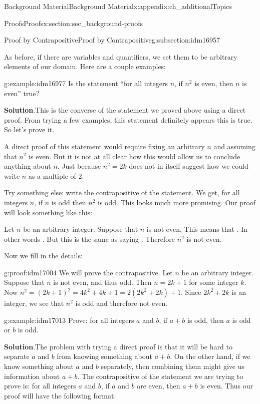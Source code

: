 \documentclass[oneside,10pt,]{book}
\numberwithin{equation}{chapter}
\begin{document}
\begin{appendixptx}{Background Material}{}{Background Material}{}{}{x:appendix:ch_additionalTopics}
\begin{sectionptx}{Proofs}{}{Proofs}{}{}{x:section:sec_background-proofs}
\begin{subsectionptx}{Proof by Contrapositive}{}{Proof by Contrapositive}{}{}{g:subsection:idm16957}
\begin{quote}
\end{quote}
As before, if there are variables and quantifiers, we set them to be arbitrary elements of our domain. Here are a couple examples:%
\begin{example}{}{g:example:idm16977}%
Is the statement ``for all integers \(n\), if \(n^2\) is even, then \(n\) is even'' true?%
\par\smallskip%
\noindent\textbf{Solution}.\hypertarget{g:solution:idm16984}{}\quad{}This is the converse of the statement we proved above using a direct proof. From trying a few examples, this statement definitely appears this is true. So let's prove it.%
\par
A direct proof of this statement would require fixing an arbitrary \(n\) and assuming that \(n^2\) is even. But it is not at all clear how this would allow us to conclude anything about \(n\). Just because \(n^2 = 2k\) does not in itself suggest how we could write \(n\) as a multiple of 2.%
\par
Try something else: write the contrapositive of the statement. We get, for all integers \(n\), if \(n\) is odd then \(n^2\) is odd. This looks much more promising. Our proof will look something like this:%
\par
Let \(n\) be an arbitrary integer. Suppose that \(n\) is not even. This means that \textellipsis{}. In other words \textellipsis{}. But this is the same as saying \textellipsis{}. Therefore \(n^2\) is not even.%
\par
Now we fill in the details:%
\begin{proofptx}{}{g:proof:idm17004}
We will prove the contrapositive. Let \(n\) be an arbitrary integer. Suppose that \(n\) is not even, and thus odd. Then \(n= 2k+1\) for some integer \(k\). Now \(n^2 = (2k+1)^2 = 4k^2 + 4k + 1 = 2(2k^2 + 2k) + 1\). Since \(2k^2 + 2k\) is an integer, we see that \(n^2\) is odd and therefore not even.%
\end{proofptx}
\end{example}
\begin{example}{}{g:example:idm17013}%
Prove: for all integers \(a\) and \(b\), if \(a + b\) is odd, then \(a\) is odd or \(b\) is odd.%
\par\smallskip%
\noindent\textbf{Solution}.\hypertarget{g:solution:idm17021}{}\quad{}The problem with trying a direct proof is that it will be hard to separate \(a\) and \(b\) from knowing something about \(a+b\). On the other hand, if we know something about \(a\) and \(b\) separately, then combining them might give us information about \(a+b\). The contrapositive of the statement we are trying to prove is: for all integers \(a\) and \(b\), if \(a\) and \(b\) are even, then \(a+b\) is even. Thus our proof will have the following format:%

\end{example}
\end{subsectionptx}
\end{sectionptx}
\end{appendixptx}
\end{document}

